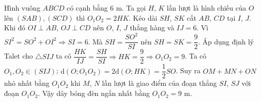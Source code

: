 \begin{ex}[1H3G5-3]
{{
		}
		Hình vuông $ABCD$ có cạnh bằng $6$ m.
		Ta gọi $H$, $K$ lần lượt là hình chiếu của $O$ lên $(SAB),(SCD)$ thì $O_1O_2=2HK$.
		Kéo dài $SH$, $SK$ cắt $AB$, $CD$ tại $I$, $J$. Khi đó $OI\perp AB$, $OJ\perp CD$ nên $O$, $I$, $J$ thẳng hàng và $IJ=6$.
		Vì $SI^2=SO^2+OI^2\Rightarrow SI=6$. Mà $SH=\dfrac{SO^2}{SI}$ nên $SH=SK=\dfrac{9}{2}$. Áp dụng định lý Talet cho $\triangle SIJ$ ta có $\dfrac{HK}{IJ}=\dfrac{SH}{SI}\Rightarrow HK=\dfrac{9}{2}\Rightarrow O_1O_2=9$. 
		Ta có $O_1, O_2\in (SIJ)$; $\mathrm{d}(O; O_1O_2)=2\mathrm{d}(O; HK)=\dfrac{1}{2}SO$. Suy ra $OM+MN+ON$ nhỏ nhất bằng $O_1O_2$ khi $M$, $N$ lần lượt là giao điểm của đoạn thẳng $SI$, $SJ$ với đoạn $O_1O_2$. Vậy dây bóng đèn ngắn nhất bằng $O_1O_2=9$ m. 	
	}
\end{ex}

